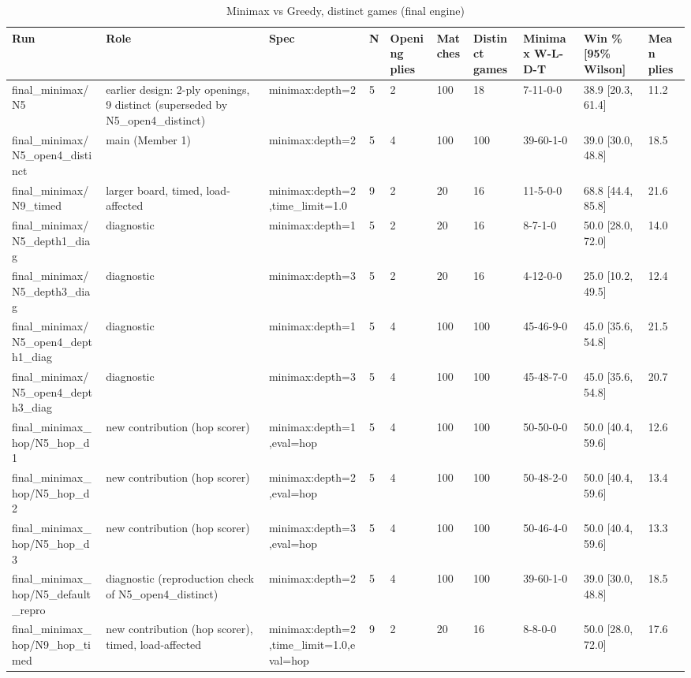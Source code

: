 \begin{table}[htbp]
\centering
\caption{Minimax vs Greedy, distinct games (final engine)}
\label{tab:minimax_vs_greedy}
\begin{tabular}{llllllllll}
\toprule
Run & Role & Spec & N & Opening plies & Matches & Distinct games & Minimax W-L-D-T & Win \% [95\% Wilson] & Mean plies \\
\midrule
final\_minimax/N5 & earlier design: 2-ply openings, 9 distinct (superseded by N5\_open4\_distinct) & minimax:depth=2 & 5 & 2 & 100 & 18 & 7-11-0-0 & 38.9 [20.3, 61.4] & 11.2 \\
final\_minimax/N5\_open4\_distinct & main (Member 1) & minimax:depth=2 & 5 & 4 & 100 & 100 & 39-60-1-0 & 39.0 [30.0, 48.8] & 18.5 \\
final\_minimax/N9\_timed & larger board, timed, load-affected & minimax:depth=2,time\_limit=1.0 & 9 & 2 & 20 & 16 & 11-5-0-0 & 68.8 [44.4, 85.8] & 21.6 \\
final\_minimax/N5\_depth1\_diag & diagnostic & minimax:depth=1 & 5 & 2 & 20 & 16 & 8-7-1-0 & 50.0 [28.0, 72.0] & 14.0 \\
final\_minimax/N5\_depth3\_diag & diagnostic & minimax:depth=3 & 5 & 2 & 20 & 16 & 4-12-0-0 & 25.0 [10.2, 49.5] & 12.4 \\
final\_minimax/N5\_open4\_depth1\_diag & diagnostic & minimax:depth=1 & 5 & 4 & 100 & 100 & 45-46-9-0 & 45.0 [35.6, 54.8] & 21.5 \\
final\_minimax/N5\_open4\_depth3\_diag & diagnostic & minimax:depth=3 & 5 & 4 & 100 & 100 & 45-48-7-0 & 45.0 [35.6, 54.8] & 20.7 \\
final\_minimax\_hop/N5\_hop\_d1 & new contribution (hop scorer) & minimax:depth=1,eval=hop & 5 & 4 & 100 & 100 & 50-50-0-0 & 50.0 [40.4, 59.6] & 12.6 \\
final\_minimax\_hop/N5\_hop\_d2 & new contribution (hop scorer) & minimax:depth=2,eval=hop & 5 & 4 & 100 & 100 & 50-48-2-0 & 50.0 [40.4, 59.6] & 13.4 \\
final\_minimax\_hop/N5\_hop\_d3 & new contribution (hop scorer) & minimax:depth=3,eval=hop & 5 & 4 & 100 & 100 & 50-46-4-0 & 50.0 [40.4, 59.6] & 13.3 \\
final\_minimax\_hop/N5\_default\_repro & diagnostic (reproduction check of N5\_open4\_distinct) & minimax:depth=2 & 5 & 4 & 100 & 100 & 39-60-1-0 & 39.0 [30.0, 48.8] & 18.5 \\
final\_minimax\_hop/N9\_hop\_timed & new contribution (hop scorer), timed, load-affected & minimax:depth=2,time\_limit=1.0,eval=hop & 9 & 2 & 20 & 16 & 8-8-0-0 & 50.0 [28.0, 72.0] & 17.6 \\
\bottomrule
\end{tabular}
\end{table}
